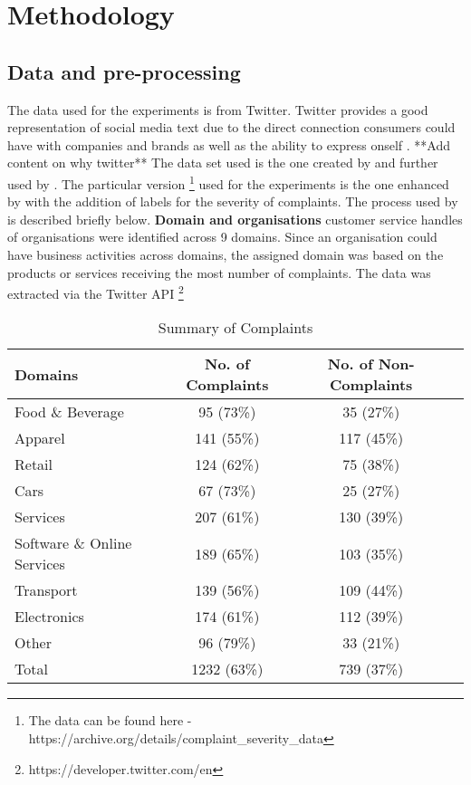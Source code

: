 \chapter{Methodology}

\section{Data and pre-processing}
The data used for the experiments is from Twitter. Twitter provides a good representation of social media text due to the direct connection consumers could have with companies and brands as well as the ability to express onself \cite{preotiuc-pietro_automatically_2019}. **Add content on why twitter**
\newline \newline
The data set used is the one created by \cite{preotiuc-pietro_automatically_2019} and further used by \cite{jin_complaint_2020}. The particular version \footnote{The data can be found here - https://archive.org/details/complaint\_severity\_data} used for the experiments is the one enhanced by \cite{jinModelingSeverityComplaints2021} with the addition of labels for the severity of complaints. The process used by \cite{preotiuc-pietro_automatically_2019} is described briefly below. 
\newline \newline
\textbf{Domain and organisations}  customer service handles of organisations were identified across 9 domains. Since an organisation could have business activities across domains, the assigned domain was based on the products or services receiving the most number of complaints. The data was extracted via the Twitter API \footnote{https://developer.twitter.com/en} 

\begin{table}[ht]
    \centering
    \begin{tabular}{|l|c|c|c|}
    \hline
    \rowcolor[gray]{0.7}
    \textbf{Domains} & \textbf{No. of Complaints} & \textbf{No. of Non-Complaints} \\
    \hline
    Food \& Beverage & 95 (73\%) & 35 (27\%)\\
    \rowcolor[gray]{0.9}
    Apparel & 141 (55\%) & 117 (45\%) \\
    Retail & 124 (62\%)& 75 (38\%)\\
    \rowcolor[gray]{0.9}
    Cars & 67 (73\%)& 25 (27\%)\\
    Services  & 207 (61\%)& 130 (39\%)\\
    \rowcolor[gray]{0.9}
    Software \& Online Services & 189 (65\%)& 103 (35\%)\\
    Transport & 139 (56\%)& 109 (44\%)\\
    \rowcolor[gray]{0.9}
    Electronics & 174 (61\%)& 112 (39\%)\\
    Other & 96 (79\%)& 33 (21\%)\\
    \hline
    \rowcolor[gray]{0.9}
    Total & 1232 (63\%)& 739 (37\%)\\
    \hline
    \end{tabular}
    \caption{Summary of Complaints}    
    \end{table}    

